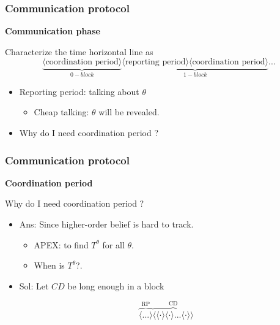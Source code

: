 \documentclass[10pt]{beamer}
\begin{document}
\begin{frame}
  \frametitle{Communication protocol}

\textbf{Communication phase}

Characterize the time horizontal line as 
\[\underbrace{\langle\text{coordination period}\rangle}_{0-block}\underbrace{\langle\text{reporting period}\rangle \langle\text{coordination period}\rangle}_{1-block}...\]

\begin{itemize}
\item \alert{Reporting period}: talking about $\theta$
\begin{itemize}
\item Cheap talking: $\theta$ will be revealed.
\end{itemize}
\item Why do I need \alert{coordination period} ?


\end{itemize}


\end{frame}


\begin{frame}
  \frametitle{Communication protocol}

\textbf{Coordination period}

Why do I need coordination period ?
\begin{itemize}
\item Ans: Since higher-order belief is hard to track.

\begin{itemize}
\item APEX: to find $T^{\theta}$ for all $\theta$.
\item When is $T^{\theta}$?.
\end{itemize}
\item Sol: Let $CD$ be long enough in a block

\[\overbrace{\langle ... \rangle}^{\text{RP}}\overbrace{\langle \langle \cdot \rangle \langle \cdot \rangle...\langle \cdot \rangle\rangle}^{\text{CD}}\] 

\end{itemize}

\end{frame}
\end{document}
